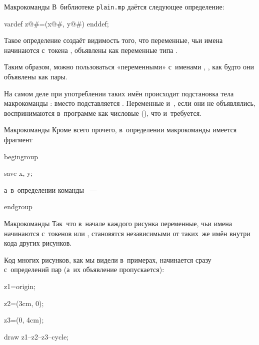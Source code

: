 \begin{frame}{Макрокоманды }
В~библиотеке \nolinkurl{plain.mp} даётся следующее определение:
\begin{programlisting}
vardef z@\#=(x@\#, y@\#) enddef;
\end{programlisting}
Такое определение создаёт видимость того, что переменные, чьи имена начинаются
с~токена , объявлены как переменные типа .

Таким образом, можно пользоваться «переменными» с~именами ,
,  как будто они объявлены как пары.

На самом деле при употреблении таких имён происходит подстановка тела
макрокоманды : вместо  подставляется
. Переменные 
и~, если они не объявлялись, воспринимаются в~программе как
числовые (), что и~требуется.
\end{frame}

\begin{frame}{Макрокоманды }
Кроме всего прочего, в~определении макрокоманды  имеется
фрагмент
\begin{programlisting}
begingroup\par
save x, y;\par
\end{programlisting}
а~в~определении команды ~—
\begin{programlisting}
endgroup
\end{programlisting}
\end{frame}

\begin{frame}{Макрокоманды }
Так~что в~начале каждого рисунка переменные, чьи имена начинаются с~токенов
 или , становятся независимыми от таких~же имён внутри
кода других рисунков.

Код многих рисунков, как мы видели в~примерах, начинается сразу с~определений
пар  (а~их объявление пропускается):
\begin{programlisting}
z1=origin;\par
z2=(3cm, 0);\par
z3=(0, 4cm);\par
\leavevmode\par
draw z1--z2--z3--cycle;\par
\end{programlisting}
\end{frame}

